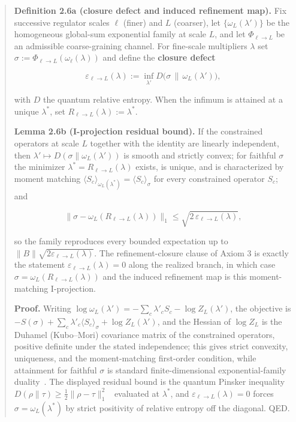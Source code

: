 \begin{quote}
\textbf{Definition 2.6a (closure defect and induced refinement map).} Fix successive regulator scales \(\ell\) (finer) and \(L\) (coarser), let \(\{\omega_L(\lambda')\}\) be the homogeneous global-sum exponential family at scale \(L\), and let \(\Phi_{\ell\to L}\) be an admissible coarse-graining channel. For fine-scale multipliers \(\lambda\) set \(\sigma := \Phi_{\ell\to L}(\omega_\ell(\lambda))\) and define the \textbf{closure defect}

\[
\varepsilon_{\ell\to L}(\lambda) := \inf_{\lambda'} D\bigl(\sigma \,\big\|\, \omega_L(\lambda')\bigr),
\]

with \(D\) the quantum relative entropy. When the infimum is attained at a unique \(\lambda^\ast\), set \(R_{\ell\to L}(\lambda) := \lambda^\ast\).

\textbf{Lemma 2.6b (I-projection residual bound).} If the constrained operators at scale \(L\) together with the identity are linearly independent, then \(\lambda' \mapsto D(\sigma\|\omega_L(\lambda'))\) is smooth and strictly convex; for faithful \(\sigma\) the minimizer \(\lambda^\ast = R_{\ell\to L}(\lambda)\) exists, is unique, and is characterized by moment matching \(\langle S_c\rangle_{\omega_L(\lambda^\ast)} = \langle S_c\rangle_\sigma\) for every constrained operator \(S_c\); and

\[
\bigl\|\sigma - \omega_L(R_{\ell\to L}(\lambda))\bigr\|_1 \le \sqrt{2\,\varepsilon_{\ell\to L}(\lambda)},
\]

so the family reproduces every bounded expectation up to \(\|B\|\sqrt{2\varepsilon_{\ell\to L}(\lambda)}\). The refinement-closure clause of Axiom 3 is exactly the statement \(\varepsilon_{\ell\to L}(\lambda) = 0\) along the realized branch, in which case \(\sigma = \omega_L(R_{\ell\to L}(\lambda))\) and the induced refinement map is this moment-matching I-projection.

\textbf{Proof.} Writing \(\log\omega_L(\lambda') = -\sum_c \lambda'_c S_c - \log Z_L(\lambda')\), the objective is \(-S(\sigma) + \sum_c \lambda'_c \langle S_c\rangle_\sigma + \log Z_L(\lambda')\), and the Hessian of \(\log Z_L\) is the Duhamel (Kubo--Mori) covariance matrix of the constrained operators, positive definite under the stated independence; this gives strict convexity, uniqueness, and the moment-matching first-order condition, while attainment for faithful \(\sigma\) is standard finite-dimensional exponential-family duality~\cite{wichmann63}. The displayed residual bound is the quantum Pinsker inequality \(D(\rho\|\tau) \ge \tfrac12\|\rho-\tau\|_1^2\)~\cite{hiaiOhyaTsukada81} evaluated at \(\lambda^\ast\), and \(\varepsilon_{\ell\to L}(\lambda) = 0\) forces \(\sigma = \omega_L(\lambda^\ast)\) by strict positivity of relative entropy off the diagonal. QED.


\end{quote}
